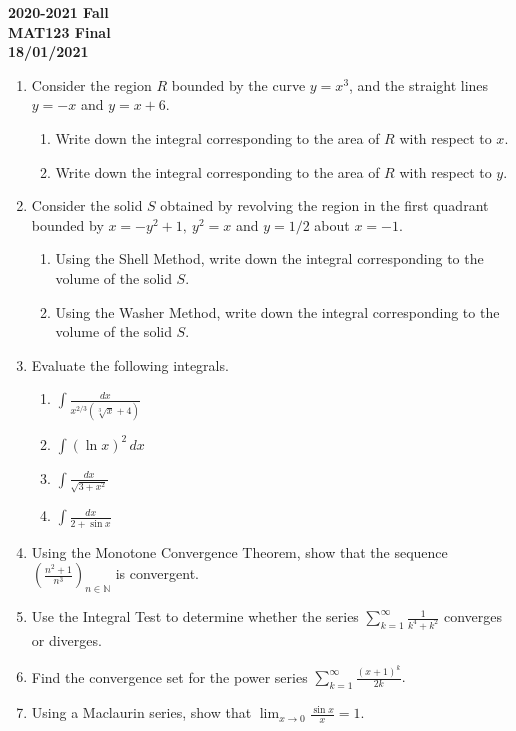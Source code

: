 \documentclass[a4paper, 12pt]{article}
\begin{document}
\pagestyle{empty}

\begin{center}
\textbf{2020-2021 Fall\\MAT123 Final\\18/01/2021}
\end{center}

\begin{enumerate}[leftmargin=*,label=\textbf{\arabic*.}]
\item Consider the region $R$ bounded by the curve $y=x^3$, and the straight lines $y=-x$ and $y=x+6$.

\begin{enumerate}[leftmargin=*,label=\textbf{\roman*.}]
\item Write down the integral corresponding to the area of $R$ with respect to $x$.
\item Write down the integral corresponding to the area of $R$ with respect to $y$.
\end{enumerate}

\item Consider the solid $S$ obtained by revolving the region in the first quadrant bounded by $x=-y^2+1,\:y^2=x$ and $y=1/2$ about $x=-1$.

\begin{enumerate}[leftmargin=*,label=\textbf{\roman*.}]
\item Using the Shell Method, write down the integral corresponding to the volume of the solid $S$.

\item Using the Washer Method, write down the integral corresponding to the volume of the solid $S$.
\end{enumerate}

\item Evaluate the following integrals.

\begin{enumerate}[leftmargin=*,label=\textbf{\alph*.}]
\item $\displaystyle\int\frac{dx}{x^{2/3}\left(\sqrt[3]{x}+4\right)}$
\item $\displaystyle\int(\ln x)^2\,dx$
\item $\displaystyle\int\frac{dx}{\sqrt{3+x^2}}$
\item $\displaystyle\int\frac{dx}{2+\sin x}$
\end{enumerate}

\item Using the Monotone Convergence Theorem, show that the sequence  $\displaystyle\left(\frac{n^2+1}{n^3}\right)_{n\in\mathbb{N}}$ is convergent.

\item Use the Integral Test to determine whether the series $\displaystyle\sum_{k=1}^{\infty}\frac1{k^4+k^2}$ converges or diverges.

\item Find the convergence set for the power series  $\displaystyle\sum_{k=1}^\infty\frac{(x+1)^k}{2k}.$

\item Using a Maclaurin series, show that $\displaystyle\lim_{x\to0}\frac{\sin x}x=1$.
\end{enumerate}
\end{document}
